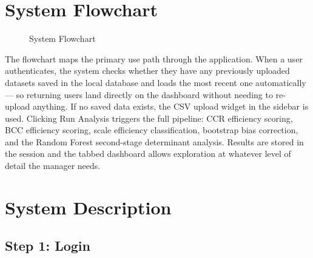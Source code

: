 \documentclass[12pt,a4paper]{report}
\begin{document}
\section{System Flowchart}

\begin{figure}[H]
\centering
{}
\caption{System Flowchart}
\label{fig:sys_flowchart}
\end{figure}

The flowchart maps the primary use path through the application. When a user authenticates,
the system checks whether they have any previously uploaded datasets saved in the local
database and loads the most recent one automatically --- so returning users land directly
on the dashboard without needing to re-upload anything. If no saved data exists, the CSV
upload widget in the sidebar is used. Clicking Run Analysis triggers the full pipeline:
CCR efficiency scoring, BCC efficiency scoring, scale efficiency classification, bootstrap
bias correction, and the Random Forest second-stage determinant analysis. Results are
stored in the session and the tabbed dashboard allows exploration at whatever level of
detail the manager needs.

\section{System Description}

\subsection{Step 1: Login}
\end{document}
